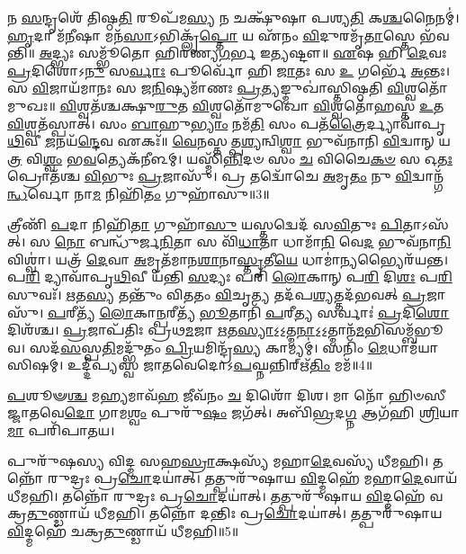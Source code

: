 𑌨 \ul{𑌸}\-𑌨𑍍𑌦𑍃𑌶𑍇᳴ 𑌤𑌿𑌷𑍍𑌠\-\ul{𑌤𑌿} 𑌰𑍂𑌪᳴𑌮\-\ul{𑌸𑍍𑌯} 𑌨 𑌚𑌕𑍍𑌷𑍁᳴𑌷𑌾 𑌪𑌶𑍍𑌯\-\ul{𑌤𑌿} 𑌕\-\ul{𑌶𑍍𑌚}\-𑌨𑍈𑌨𑌮𑍍॑। 
\-\ul{𑌹𑍃}\-𑌦𑌾 𑌮᳴\-\ul{𑌨𑍀}\-𑌷𑌾 𑌮𑌨᳴\-\ul{𑌸𑌾}\-𑌽𑌭𑌿𑌕𑍍𑌲𑍃᳴\-\ul{𑌪𑍍𑌤𑍋} 𑌯 𑌏᳴𑌨𑌂 \ul{𑌵𑌿}\-𑌦𑍁𑌰𑌮𑍃᳴\-\ul{𑌤𑌾}\-𑌸𑍍𑌤𑍇 𑌭᳴𑌵𑌨𑍍𑌤𑌿॥ 
\-\ul{𑌅}\-𑌦𑍍𑌭𑍍𑌯𑌃 𑌸𑌮𑍍𑌭𑍂᳴𑌤𑍋 𑌹𑌿𑌰𑌣𑍍𑌯\-\ul{𑌗}\-𑌰𑍍𑌭 𑌇\-\ul{𑌤𑍍𑌯}\-𑌷𑍍𑌟𑍗॥ 
\-\ul{𑌏}\-𑌷 𑌹𑌿 \ul{𑌦𑍇}\-𑌵𑌃 \ul{𑌪𑍍𑌰}\-𑌦𑌿𑌶𑍋𑌽\-\ul{𑌨𑍁} 𑌸\-\ul{𑌰𑍍𑌵𑌾𑌃} 𑌪𑍂𑌰𑍍𑌵𑍋᳴ 𑌹𑌿 \ul{𑌜𑌾}\-𑌤𑌃 𑌸 \ul{𑌉} 𑌗𑌰𑍍𑌭𑍇᳴ \ul{𑌅}\-𑌨𑍍𑌤𑌃। 
𑌸 \ul{𑌵𑌿}\-𑌜𑌾𑌯᳴𑌮𑌾𑌨𑌃 𑌸 𑌜\-\ul{𑌨𑌿}\-𑌷𑍍𑌯𑌮𑌾᳴𑌣𑌃 \ul{𑌪𑍍𑌰}\-𑌤𑍍𑌯𑌙𑍍𑌮𑍁𑌖𑌾॑𑌸𑍍𑌤𑌿𑌷𑍍𑌠𑌤𑌿 \ul{𑌵𑌿}\-𑌶𑍍𑌵𑌤𑍋᳴𑌮𑍁𑌖𑌃॥ 
\-\ul{𑌵𑌿}\-𑌶𑍍𑌵𑌤᳴𑌶𑍍𑌚𑌕𑍍𑌷𑍁\-\ul{𑌰𑍁}\-𑌤 \ul{𑌵𑌿}\-𑌶𑍍𑌵𑌤𑍋᳴𑌮𑍁𑌖𑍋 \ul{𑌵𑌿}\-𑌶𑍍𑌵𑌤𑍋᳴𑌹𑌸𑍍𑌤 \ul{𑌉}\-𑌤 \ul{𑌵𑌿}\-𑌶𑍍𑌵𑌤᳴𑌸𑍍𑌪𑌾𑌤𑍍। 
𑌸𑌂 \ul{𑌬𑌾}\-𑌹𑍁\-\ul{𑌭𑍍𑌯𑌾𑌂} 𑌨𑌮᳴\-\ul{𑌤𑌿} 𑌸𑌂 𑌪𑌤᳴\-\ul{𑌤𑍍𑌰𑍈}\-𑌰𑍍𑌦𑍍𑌯𑌾𑌵𑌾᳴𑌪𑍃\-\ul{𑌥𑌿}\-𑌵𑍀 \ul{𑌜}\-𑌨𑌯᳴\-\ul{𑌨𑍍𑌦𑍇}\-𑌵 𑌏𑌕𑌃᳴॥ 
\-\ul{𑌵𑍇}\-𑌨𑌸𑍍𑌤𑌤𑍍𑌪\-\ul{𑌶𑍍𑌯}\-𑌨𑍍𑌵𑌿\-\ul{𑌶𑍍𑌵𑌾} 𑌭𑍁𑌵᳴𑌨𑌾𑌨𑌿 \ul{𑌵𑌿}\-𑌦𑍍𑌵𑌾𑌨𑍍 𑌯\-\ul{𑌤𑍍𑌰} 𑌵𑌿\-\ul{𑌶𑍍𑌵𑌂} 𑌭\-\ul{𑌵}\-𑌤𑍍𑌯𑍇𑌕᳴𑌨𑍀𑌳𑌮𑍍। 
𑌯𑌸𑍍𑌮𑌿᳴\-\ul{𑌨𑍍𑌨𑌿}\-𑌦𑍞 𑌸𑌂 \ul{𑌚} 𑌵𑌿𑌚𑍈\-\ul{𑌕}\-\-\ul{𑍞} 𑌸 𑌓\-\ul{𑌤𑌃} 𑌪𑍍𑌰𑍋𑌤᳴𑌶𑍍𑌚 \ul{𑌵𑌿}\-𑌭𑍁𑌃 \ul{𑌪𑍍𑌰}\-𑌜𑌾𑌸𑍁᳴। 
𑌪𑍍𑌰 𑌤𑌦𑍍𑌵𑍋᳴𑌚𑍇 \ul{𑌅}\-𑌮𑍃\-\ul{𑌤𑌂} 𑌨𑍁 \ul{𑌵𑌿}\-𑌦𑍍𑌵𑌾𑌨𑍍𑌗᳴\-\ul{𑌨𑍍𑌧}\-𑌰𑍍𑌵𑍋 𑌨𑌾\-\ul{𑌮} 𑌨𑌿𑌹𑌿᳴\-\ul{𑌤𑌂} 𑌗𑍁𑌹𑌾᳴𑌸𑍁॥3॥

𑌤𑍍𑌰𑍀𑌣𑌿᳴ \ul{𑌪}\-𑌦𑌾 𑌨𑌿𑌹𑌿᳴\-\ul{𑌤𑌾} 𑌗𑍁𑌹𑌾᳴\-\ul{𑌸𑍁} 𑌯𑌸𑍍𑌤𑌦𑍍𑌵𑍇𑌦᳴ 𑌸\-\ul{𑌵𑌿}\-𑌤𑍁𑌃 \ul{𑌪𑌿}\-𑌤𑌾𑌽𑌸᳴𑌤𑍍। 
𑌸 \ul{𑌨𑍋} 𑌬𑌨𑍍𑌧𑍁᳴𑌰𑍍𑌜\-\ul{𑌨𑌿}\-𑌤𑌾 𑌸 𑌵𑌿᳴\-\ul{𑌧𑌾}\-𑌤𑌾 𑌧𑌾𑌮𑌾᳴\-\ul{𑌨𑌿} 𑌵𑍇\-\ul{𑌦} 𑌭𑍁𑌵᳴𑌨𑌾\-\ul{𑌨𑌿} 𑌵𑌿𑌶𑍍𑌵𑌾॑। 
𑌯𑌤𑍍𑌰᳴ \ul{𑌦𑍇}\-𑌵𑌾 \ul{𑌅}\-𑌮𑍃𑌤᳴𑌮𑌾𑌨\-\ul{𑌶𑌾}\-𑌨𑌾\-\ul{𑌸𑍍𑌤𑍃}\-𑌤𑍀\-\ul{𑌯𑍇} 𑌧𑌾𑌮𑌾॑\-\ul{𑌨𑍍𑌯}\-𑌭𑍍𑌯𑍈𑌰᳴𑌯𑌨𑍍𑌤। 
𑌪\-\ul{𑌰𑌿} 𑌦𑍍𑌯𑌾𑌵𑌾᳴𑌪𑍃\-\ul{𑌥𑌿}\-𑌵𑍀 𑌯᳴𑌨𑍍𑌤𑌿 \ul{𑌸}\-𑌦𑍍𑌯𑌃 𑌪𑌰𑌿᳴ \ul{𑌲𑍋}\-𑌕𑌾𑌨𑍍 𑌪\-\ul{𑌰𑌿} 𑌦𑌿\-\ul{𑌶𑌃} 𑌪\-\ul{𑌰𑌿} 𑌸𑍁𑌵𑌃᳴। 
\-\ul{𑌋}\-𑌤\-\ul{𑌸𑍍𑌯} 𑌤𑌨𑍍𑌤𑍁𑌂᳴ 𑌵𑌿𑌤𑌤𑌂 \ul{𑌵𑌿}\-𑌚𑍃\-\ul{𑌤𑍍𑌯} 𑌤𑌦᳴𑌪\-\ul{𑌶𑍍𑌯}\-𑌤𑍍𑌤𑌦᳴𑌭𑌵𑌤𑍍 \ul{𑌪𑍍𑌰}\-𑌜𑌾𑌸𑍁᳴। 
\-\ul{𑌪}\-𑌰𑍀𑌤𑍍𑌯᳴ \ul{𑌲𑍋}\-𑌕𑌾\-\ul{𑌨𑍍𑌪}\-𑌰𑍀𑌤𑍍𑌯᳴ \ul{𑌭𑍂}\-𑌤𑌾𑌨𑌿᳴ \ul{𑌪}\-𑌰𑍀\-\ul{𑌤𑍍𑌯} 𑌸𑌰𑍍𑌵𑌾𑌃॑ \ul{𑌪𑍍𑌰}\-𑌦𑌿\-\ul{𑌶𑍋} 𑌦𑌿𑌶᳴𑌶𑍍𑌚। 
\-\ul{𑌪𑍍𑌰}\-𑌜𑌾𑌪᳴𑌤𑌿𑌃 𑌪𑍍𑌰𑌥\-\ul{𑌮}\-𑌜𑌾 \ul{𑌋}\-𑌤\-\ul{𑌸𑍍𑌯𑌾}\-𑌽॒𑌽॒𑌤𑍍𑌮\-\ul{𑌨𑌾}\-𑌽॒𑌽॒𑌤𑍍𑌮𑌾𑌨᳴\-\ul{𑌮}\-𑌭𑌿𑌸𑌮𑍍𑌬᳴𑌭𑍂𑌵। 
𑌸𑌦᳴\-\ul{𑌸}\-𑌸𑍍𑌪\-\ul{𑌤𑌿}\-𑌮𑌦𑍍𑌭𑍁᳴𑌤𑌂 \ul{𑌪𑍍𑌰𑌿}\-𑌯𑌮𑌿𑌨𑍍𑌦𑍍𑌰᳴\-\ul{𑌸𑍍𑌯} 𑌕𑌾𑌮𑍍𑌯𑌮𑍍॑। 
𑌸𑌨𑌿𑌂᳴ \ul{𑌮𑍇}\-𑌧𑌾𑌮᳴𑌯𑌾𑌸𑌿𑌷𑌮𑍍। 
𑌉𑌦𑍍𑌦𑍀॑𑌪𑍍𑌯𑌸𑍍𑌵 𑌜𑌾𑌤𑌵𑍇𑌦𑍋𑌽\-\ul{𑌪}\-𑌘𑍍𑌨𑌨𑍍𑌨𑌿𑌰𑍍\mbox{}𑌋᳴\-\ul{𑌤𑌿𑌂} 𑌮𑌮᳴॥4॥

\-\ul{𑌪}\-𑌶𑍂𑍟\-\ul{𑌶𑍍𑌚} 𑌮\-\ul{𑌹𑍍𑌯}\-𑌮𑌾𑌵᳴\-\ul{𑌹} 𑌜𑍀𑌵᳴𑌨𑌂 \ul{𑌚} 𑌦𑌿𑌶𑍋᳴ 𑌦𑌿𑌶। 
𑌮𑌾 𑌨𑍋᳴ 𑌹𑌿𑍞𑌸𑍀𑌜𑍍𑌜𑌾𑌤𑌵𑍇\-\ul{𑌦𑍋} 𑌗𑌾𑌮\-\ul{𑌶𑍍𑌵𑌂} 𑌪𑍁𑌰𑍁᳴\-\ul{𑌷𑌂} 𑌜𑌗᳴𑌤𑍍। 
𑌅𑌬𑌿᳴\-\ul{𑌭𑍍𑌰}\-𑌦\-\ul{𑌗𑍍𑌨} 𑌆𑌗᳴𑌹𑌿 \ul{𑌶𑍍𑌰𑌿}\-𑌯𑌾 \ul{𑌮𑌾} 𑌪𑌰𑌿᳴𑌪𑌾𑌤𑌯।


 𑌪𑍁𑌰𑍁᳴𑌷𑌸𑍍𑌯 𑌵𑌿𑌦𑍍𑌮 𑌸𑌹\-\ul{𑌸𑍍𑌰𑌾}\-𑌕𑍍𑌷𑌸𑍍𑌯᳴ 𑌮𑌹𑌾\-\ul{𑌦𑍇}\-𑌵𑌸𑍍𑌯᳴ 𑌧𑍀𑌮𑌹𑌿। 
 𑌤𑌨𑍍𑌨𑍋᳴ 𑌰𑍁𑌦𑍍𑌰𑌃 𑌪𑍍𑌰\-\ul{𑌚𑍋}\-𑌦𑌯𑌾॑𑌤𑍍। 
 𑌤𑌤𑍍𑌪𑍁𑌰𑍁᳴𑌷𑌾𑌯 \ul{𑌵𑌿}\-𑌦𑍍𑌮𑌹𑍇᳴ 𑌮𑌹𑌾\-\ul{𑌦𑍇}\-𑌵𑌾𑌯᳴ 𑌧𑍀𑌮𑌹𑌿। 
 𑌤𑌨𑍍𑌨𑍋᳴ 𑌰𑍁𑌦𑍍𑌰𑌃 𑌪𑍍𑌰\-\ul{𑌚𑍋}\-𑌦𑌯𑌾॑𑌤𑍍। 
 𑌤𑌤𑍍𑌪𑍁𑌰𑍁᳴𑌷𑌾𑌯 \ul{𑌵𑌿}\-𑌦𑍍𑌮𑌹𑍇᳴ 𑌵𑌕𑍍𑌰\-\ul{𑌤𑍁}\-𑌣𑍍𑌡𑌾𑌯᳴ 𑌧𑍀𑌮𑌹𑌿। 
 𑌤𑌨𑍍𑌨𑍋᳴ 𑌦𑌨𑍍𑌤𑌿𑌃 𑌪𑍍𑌰\-\ul{𑌚𑍋}\-𑌦𑌯𑌾॑𑌤𑍍। 
 𑌤𑌤𑍍𑌪𑍁𑌰𑍁᳴𑌷𑌾𑌯 \ul{𑌵𑌿}\-𑌦𑍍𑌮𑌹𑍇᳴ 𑌚𑌕𑍍𑌰\-\ul{𑌤𑍁}\-𑌣𑍍𑌡𑌾𑌯᳴ 𑌧𑍀𑌮𑌹𑌿॥5॥

